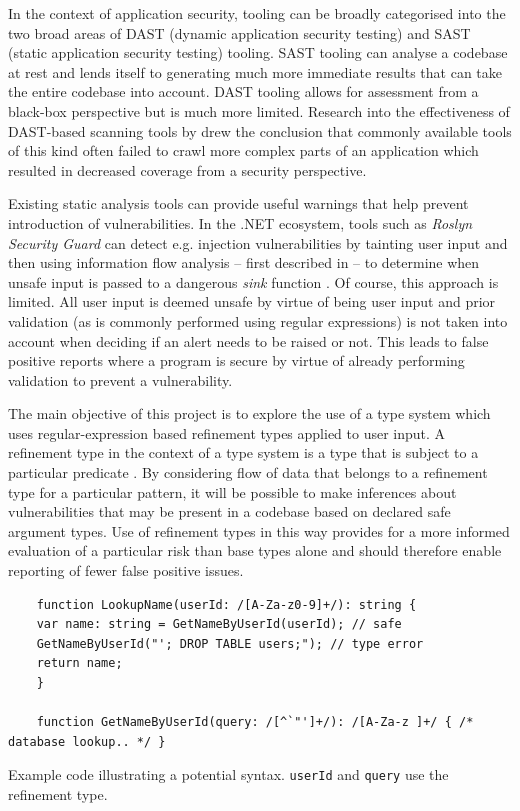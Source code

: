 \documentclass[a4paper,openany,12pt]{book}
\begin{document}
In the context of application security, tooling can be broadly categorised into the two broad areas of DAST (dynamic application security testing) and SAST (static application security testing) tooling. SAST tooling can analyse a codebase at rest and lends itself to generating much more immediate results that can take the entire codebase into account. DAST tooling allows for assessment from a black-box perspective but is much more limited. Research into the effectiveness of DAST-based scanning tools by \citet{doupe2010johnny} drew the conclusion that commonly available tools of this kind often failed to crawl more complex parts of an application which resulted in decreased coverage from a security perspective.

Existing static analysis tools can provide useful warnings that help prevent introduction of vulnerabilities.
In the .NET ecosystem, tools such as \emph{Roslyn Security Guard} can detect e.g. injection vulnerabilities by tainting
user input and then using information flow analysis -- first described in \cite{denning1977certification} -- to
determine when unsafe input is passed to a dangerous \emph{sink} function \citep{rosylynsecguard}.
Of course, this approach is limited.
All user input is deemed unsafe by virtue of being user input and prior validation (as is commonly performed using
regular expressions) is not taken into account when deciding if an alert needs to be raised or not.
This leads to false positive reports where a program is secure by virtue of already performing validation to prevent a
vulnerability.

The main objective of this project is to explore the use of a type system which uses regular-expression based refinement
types applied to user input.
A refinement type in the context of a type system is a type that is subject to a particular predicate \citep[p.
207]{benjaminpierce2002}.
By considering flow of data that belongs to a refinement type for a particular pattern, it will be possible to make
inferences about vulnerabilities that may be present in a codebase based on declared safe argument types.
Use of refinement types in this way provides for a more informed evaluation of a particular risk than base types alone
and should therefore enable reporting of fewer false positive issues.

\begin{listing}[H]
    \begin{verbatim}
    function LookupName(userId: /[A-Za-z0-9]+/): string {
    var name: string = GetNameByUserId(userId); // safe
    GetNameByUserId("'; DROP TABLE users;"); // type error
    return name;
    }
    
    function GetNameByUserId(query: /[^`"']+/): /[A-Za-z ]+/ { /* database lookup.. */ }
    \end{verbatim}
    \caption{Example code illustrating a potential syntax. \texttt{userId} and \texttt{query} use the refinement type.}
\end{listing}
\end{document}
